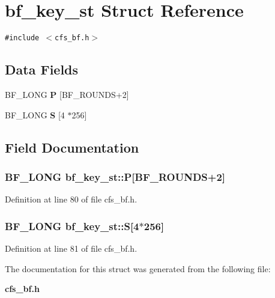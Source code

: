 \section{bf\_\-key\_\-st Struct Reference}
\label{structbf__key__st}
{\tt \#include $<$cfs\_\-bf.h$>$}

\subsection*{Data Fields}
\begin{CompactItemize}
\item 
BF\_\-LONG {\bf P} [BF\_\-ROUNDS+2]
\item 
BF\_\-LONG {\bf S} [4 $\ast$256]
\end{CompactItemize}


\subsection{Field Documentation}
\subsubsection{\setlength{\rightskip}{0pt plus 5cm}BF\_\-LONG {\bf bf\_\-key\_\-st::P}[BF\_\-ROUNDS+2]}\label{structbf__key__st_o0}




Definition at line 80 of file cfs\_\-bf.h.
\subsubsection{\setlength{\rightskip}{0pt plus 5cm}BF\_\-LONG {\bf bf\_\-key\_\-st::S}[4$\ast$256]}\label{structbf__key__st_o1}




Definition at line 81 of file cfs\_\-bf.h.

The documentation for this struct was generated from the following file:\begin{CompactItemize}
\item 
{\bf cfs\_\-bf.h}\end{CompactItemize}
